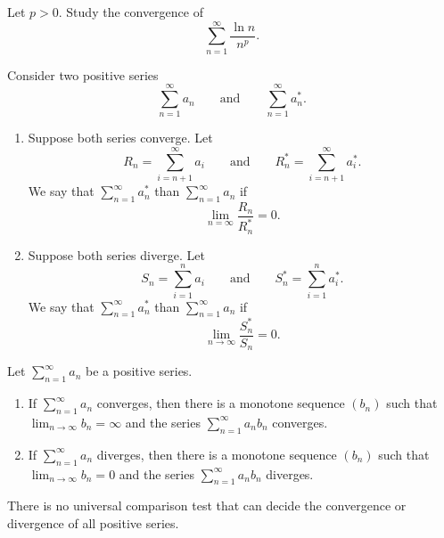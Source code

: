 \begin{example}
  Let $p > 0$. Study the convergence of
  \[ \sum_{n = 1}^{\infty} \frac{\ln n}{n^p}. \]
\end{example}

\begin{definition}
  Consider two positive series
  \[ \sum_{n = 1}^{\infty} a_n \qquad \text{and} \qquad \sum_{n =
  1}^{\infty} a_n^\ast. \]
  \begin{enumerate}
    \item Suppose both series converge. Let
      \[ R_n = \sum_{i = n + 1}^{\infty} a_i \qquad \text{and} \qquad
      R_n^\ast = \sum_{i = n + 1}^{\infty} a_i^\ast. \]
      We say that $\sum_{n = 1}^{\infty} a_n^\ast$  than $\sum_{n = 1}^{\infty} a_n$ if
      \[ \lim_{n = \infty} \frac{R_n}{R_n^\ast} = 0. \]
    \item Suppose both series diverge. Let
      \[ S_n = \sum_{i = 1}^{n} a_i \qquad \text{and} \qquad S_n^\ast
      = \sum_{i = 1}^{n} a_i^\ast. \]
      We say that $\sum_{n = 1}^{\infty} a_n^\ast$  than $\sum_{n = 1}^{\infty} a_n$ if
      \[ \lim_{n \to \infty} \frac{S_n^\ast}{S_n} = 0. \]
  \end{enumerate}
\end{definition}

\begin{lemma}
  Let $\sum_{n = 1}^{\infty} a_n$ be a positive series.
  \begin{enumerate}
    \item If $\sum_{n = 1}^{\infty} a_n$ converges, then there is a
      monotone sequence $(b_n)$ such that \\
      $\lim_{n \to \infty} b_n = \infty$ and the series $\sum_{n =
      1}^{\infty} a_n b_n$ converges.
    \item If $\sum_{n = 1}^{\infty} a_n$ diverges, then there is a
      monotone sequence $(b_n)$ such that \\
      $\lim_{n \to \infty} b_n = 0$ and the series $\sum_{n =
      1}^{\infty} a_n b_n$ diverges.
  \end{enumerate}
\end{lemma}

\begin{theorem}
  There is no universal comparison test that can decide the
  convergence or divergence of all positive series.
\end{theorem}

